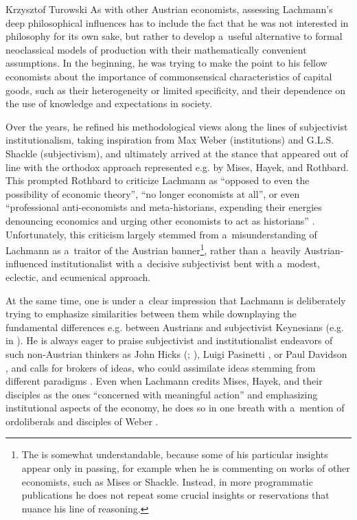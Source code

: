 \begin{artengenv}{Krzysztof Turowski}
As with other Austrian economists, assessing Lachmann's deep philosophical influences has to include the fact that he was not interested in philosophy for its own sake, but rather to develop a~useful alternative to formal neoclassical models of production with their mathematically convenient assumptions. In the beginning, he was trying to make the point to his fellow economists about the importance of commonsensical characteristics of capital goods, such as their heterogeneity or limited specificity, and their dependence on the use of knowledge and expectations in society.

Over the years, he refined his methodological views along the lines of subjectivist institutionalism, taking inspiration from Max Weber (institutions) and G.L.S. Shackle (subjectivism), and ultimately arrived at the stance that appeared out of line with the orthodox approach represented e.g. by Mises, Hayek, and Rothbard.
This prompted Rothbard to criticize Lachmann as ``opposed to even the possibility of economic theory'', ``no longer economists at all'', or even ``professional anti-economists and meta-historians, expending their energies denouncing economics and urging other economists to act as historians'' \parencite[53]{rothbard-present}.
Unfortunately, this criticism largely stemmed from a~misunderstanding of Lachmann as a~traitor of the Austrian banner\footnote{The is somewhat understandable, because some of his particular insights appear only in passing, for example when he is commenting on works of other economists, such as Mises or Shackle. Instead, in more programmatic publications he does not repeat some crucial insights or reservations that nuance his line of reasoning.}, rather than a~heavily Austrian-influenced institutionalist with a~decisive subjectivist bent with a~modest, eclectic, and ecumenical approach.

At the same time, one is under a~clear impression that Lachmann is deliberately trying to emphasize similarities between them while downplaying the fundamental differences e.g. between Austrians and subjectivist Keynesians (e.g. in \cite[184]{lachmann-keynes}).
He is always eager to praise subjectivist and institutionalist endeavors of such non-Austrian thinkers as John Hicks (\cite[218]{lachmann-vicissitudes}; \citeyear[184]{lachmann-keynes}), Luigi Pasinetti \parencite[164]{lachmann-salvage}, or Paul Davidson \parencite[166]{lachmann-salvage}, and calls for brokers of ideas, who could assimilate ideas stemming from different paradigms \parencite[282]{lachmann-hermeneutic}.
Even when Lachmann credits Mises, Hayek, and their disciples as the ones ``concerned with meaningful action'' and emphasizing institutional aspects of the economy, he does so in one breath with a~mention of ordoliberals and disciples of Weber \parencite[251--253]{lachmann-legislation}.


\end{artengenv}
